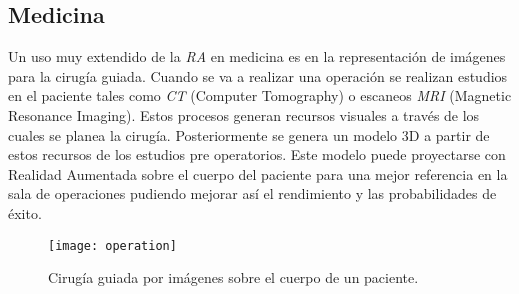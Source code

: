 \subsection*{Medicina}

Un uso muy extendido de la \textit{RA} en medicina es en la representación de imágenes para la cirugía guiada. Cuando se va a realizar una operación se realizan estudios en el paciente tales como \textit{CT} (Computer Tomography) o escaneos \textit{MRI} (Magnetic Resonance Imaging). Estos procesos generan recursos visuales a través de los cuales se planea la cirugía. Posteriormente se genera un modelo 3D a partir de estos recursos de los estudios pre operatorios. Este modelo puede proyectarse con Realidad Aumentada sobre el cuerpo del paciente para una mejor referencia en la sala de operaciones pudiendo mejorar así el rendimiento y las probabilidades de éxito.\cite{arintro}

\begin{figure}[h]
    \centering
    \texttt{[image: operation]}
    \caption[Cirugía guiada por imágenes]{Cirugía guiada por imágenes sobre el cuerpo de un paciente.}
    \label{fig:operation}
\end{figure}